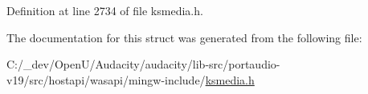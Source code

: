Definition at line 2734 of file ksmedia.\+h.



The documentation for this struct was generated from the following file\+:\begin{DoxyCompactItemize}
\item 
C\+:/\+\_\+dev/\+Open\+U/\+Audacity/audacity/lib-\/src/portaudio-\/v19/src/hostapi/wasapi/mingw-\/include/\hyperlink{ksmedia_8h}{ksmedia.\+h}\end{DoxyCompactItemize}
